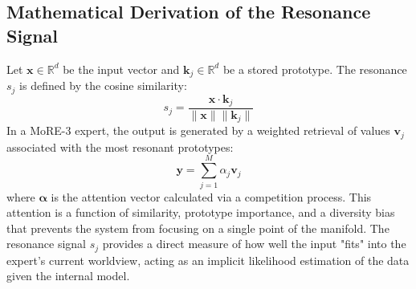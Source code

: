 \documentclass[11pt,hidelinks]{article}
\begin{document}
\subsection{Mathematical Derivation of the Resonance Signal}
Let $\mathbf{x} \in \mathbb{R}^d$ be the input vector and $\mathbf{k}_j \in \mathbb{R}^d$ be a stored prototype. The resonance $s_j$ is defined by the cosine similarity:
\begin{equation}
s_j = \frac{\mathbf{x} \cdot \mathbf{k}_j}{\|\mathbf{x}\| \|\mathbf{k}_j\|}
\end{equation}
In a MoRE-3 expert, the output is generated by a weighted retrieval of values $\mathbf{v}_j$ associated with the most resonant prototypes:
\begin{equation}
\mathbf{y} = \sum_{j=1}^M \alpha_j \mathbf{v}_j
\end{equation}
where $\boldsymbol{\alpha}$ is the attention vector calculated via a competition process. This attention is a function of similarity, prototype importance, and a diversity bias that prevents the system from focusing on a single point of the manifold. The resonance signal $s_j$ provides a direct measure of how well the input "fits" into the expert's current worldview, acting as an implicit likelihood estimation of the data given the internal model.
\end{document}
